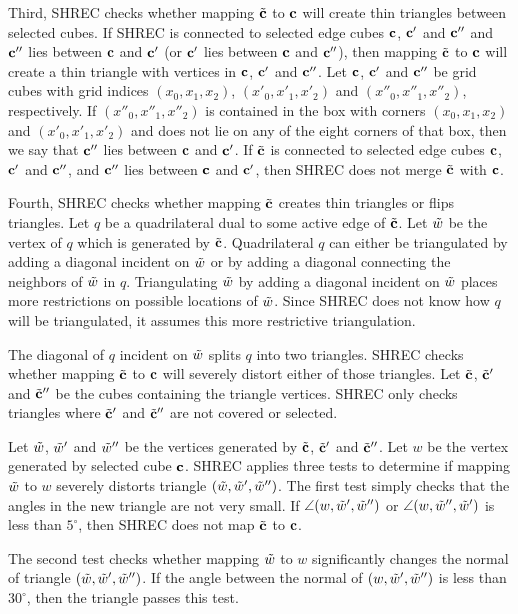 Third, SHREC checks whether mapping ${\tilde{\mathbf{c}}}$ to $\mathbf{c}$
will create thin triangles between selected cubes.
If SHREC is connected to selected edge cubes $\mathbf{c}$, $\mathbf{c}'$ and $\mathbf{c}''$
and $\mathbf{c}''$ lies between $\mathbf{c}$ and $\mathbf{c}'$
(or $\mathbf{c}'$ lies between $\mathbf{c}$ and $\mathbf{c}''$),
then mapping ${\tilde{\mathbf{c}}}$ to $\mathbf{c}$ will create a thin triangle
with vertices in $\mathbf{c}$, $\mathbf{c}'$ and $\mathbf{c}''$.
Let $\mathbf{c}$, $\mathbf{c}'$ and $\mathbf{c}''$ be grid cubes with grid indices
$(x_0,x_1,x_2)$, $(x'_0,x'_1,x'_2)$ and $(x''_0,x''_1,x''_2)$, respectively.
If $(x''_0,x''_1,x''_2)$ is contained in the box with corners
$(x_0,x_1,x_2)$ and $(x'_0,x'_1,x'_2)$ and does not lie on any 
of the eight corners of that box,
then we say that $\mathbf{c}''$ lies between $\mathbf{c}$ and $\mathbf{c}'$.
If ${\tilde{\mathbf{c}}}$ is connected to selected edge cubes $\mathbf{c}$, $\mathbf{c}'$ and $\mathbf{c}''$,
and $\mathbf{c}''$ lies between $\mathbf{c}$ and $\mathbf{c}'$,
then SHREC does not merge ${\tilde{\mathbf{c}}}$ with $\mathbf{c}$.

Fourth, SHREC checks whether mapping ${\tilde{\mathbf{c}}}$ creates thin triangles
or flips triangles.
Let $q$ be a quadrilateral dual to some active edge of ${\tilde{\mathbf{c}}}$.
Let $\tilde{w}$ be the vertex of $q$ which is generated by ${\tilde{\mathbf{c}}}$.
Quadrilateral $q$ can either be triangulated by adding a diagonal
incident on $\tilde{w}$ or by adding a diagonal connecting the neighbors
of $\tilde{w}$ in $q$.
Triangulating $\tilde{w}$ by adding a diagonal incident on $\tilde{w}$
places more restrictions on possible locations of $\tilde{w}$.
Since SHREC does not know how $q$ will be triangulated,
it assumes this more restrictive triangulation.

The diagonal of $q$ incident on $\tilde{w}$ splits $q$ into two triangles.
SHREC checks whether mapping ${\tilde{\mathbf{c}}}$ to $\mathbf{c}$ will severely distort
either of those triangles.
Let ${\tilde{\mathbf{c}}}$, ${\tilde{\mathbf{c}}}'$ and ${\tilde{\mathbf{c}}}''$ be the cubes 
containing the triangle vertices.
SHREC only checks triangles where ${\tilde{\mathbf{c}}}'$ and ${\tilde{\mathbf{c}}}''$ 
are not covered or selected.

Let $\tilde{w}$, $\tilde{w}'$ and $\tilde{w}''$ be the vertices generated
by ${\tilde{\mathbf{c}}}$, ${\tilde{\mathbf{c}}}'$ and ${\tilde{\mathbf{c}}}''$.
Let $w$ be the vertex generated by selected cube $\mathbf{c}$.
SHREC applies three tests to determine if mapping $\tilde{w}$ to $w$
severely distorts triangle $(\tilde{w},\tilde{w}',\tilde{w}'')$.
The first test simply checks that the angles in the new triangle
are not very small.
If $\angle(w,\tilde{w}',\tilde{w}'')$ or $\angle(w,\tilde{w}'',\tilde{w}')$ is less than $5^\circ$,
then SHREC does not map ${\tilde{\mathbf{c}}}$ to $\mathbf{c}$.

The second test checks whether mapping $\tilde{w}$ to $w$
significantly changes the normal of triangle $(\tilde{w},\tilde{w}',\tilde{w}'')$.
If the angle between the normal of $(w, \tilde{w}', \tilde{w}'')$ is less than $30^\circ$,
then the triangle passes this test.

